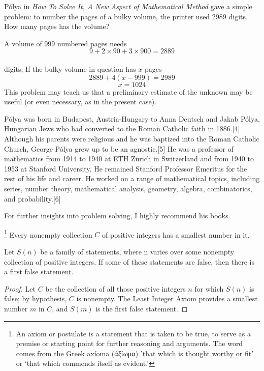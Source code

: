 P\'olya in \textit{How To Solve It, A New Aspect of Mathematical Method} gave a simple problem: to number the pages of a bulky volume, the printer 
used 2989 digits. How many pages has the volume? 

A volume of 999 numbered pages needs\\ 
$$9 + 2 \times 90 + 3 \times 900 = 2889$$ \\
digits, If the bulky volume in question has $x$ pages \\
$$2889 + 4(x-999) = 2989 $$
$$x = 1024 $$
This problem may teach us that a preliminary estimate 
of the unknown may be useful (or even necessary, as in the present case). 

Pólya was born in Budapest, Austria-Hungary to Anna Deutsch and Jakab Pólya, Hungarian Jews who had converted to the Roman Catholic faith in 1886.[4] Although his parents were religious and he was baptized into the Roman Catholic Church, George Pólya grew up to be an agnostic.[5] He was a professor of mathematics from 1914 to 1940 at ETH Zürich in Switzerland and from 1940 to 1953 at Stanford University. He remained Stanford Professor Emeritus for the rest of his life and career. He worked on a range of mathematical topics, including series, number theory, mathematical analysis, geometry, algebra, combinatorics, and probability.[6] 

For further insights into problem solving, I highly recommend his books.


\begin{Axiom}\footnote{An axiom or postulate is a statement that is taken to be true, to serve as a premise or starting point for further reasoning and arguments. The word comes from the Greek axíōma (ἀξίωμα) 'that which is thought worthy or fit' or `that which commends itself as evident.'} Every nonempty collection $C$ of positive integers has a smallest number in it.
\end{Axiom}

\begin{theorem} 
Let $S(n)$ be a family of statements, where n 
varies over some nonempty collection of positive integers. If some of these 
statements are false, then there is a first false statement. 

\begin{proof}
Let $C$ be the collection of all those positive integers $n$ for which $S(n)$ 
is false; by hypothesis, $C$ is nonempty. The Least Integer Axiom provides a 
smallest number $m$ in $C$, and $S(m)$ is the first false statement. 
\end{proof}
\end{theorem}

